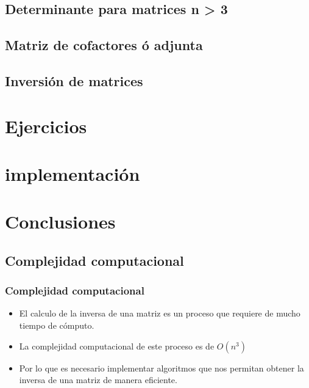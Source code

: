 \documentclass{beamer}
\begin{document}
    \subsection{Determinante para matrices n > 3}
    \subsection{Matriz de cofactores ó adjunta}
    \subsection{Inversión de matrices}
    \section{Ejercicios}
    \section{implementación}
    \section{Conclusiones}
    \subsection{Complejidad computacional}

    \begin{frame}
        \frametitle{Complejidad computacional}
        \begin{itemize}
            \item El calculo de la inversa de una matriz es un proceso que requiere de mucho tiempo de cómputo.\\
            \item La complejidad computacional de este proceso es de $O(n^3)$\\
            \item Por lo que es necesario implementar algoritmos que nos permitan obtener la inversa de una matriz de manera eficiente.\\
        \end{itemize}
    \end{frame}
\end{document}
